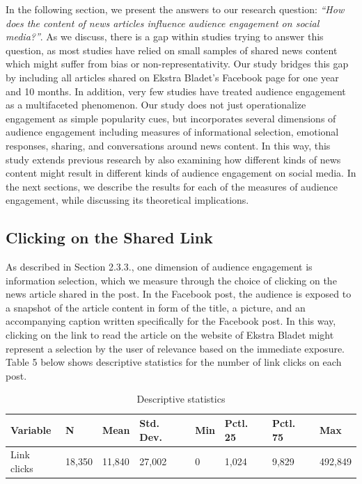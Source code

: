 \documentclass[
]{article}
\begin{document}
In the following section, we present the answers to our research
question: \emph{``How does the content of news articles influence
audience engagement on social media?''}. As we discuss, there is a gap
within studies trying to answer this question, as most studies have
relied on small samples of shared news content which might suffer from
bias or non-representativity. Our study bridges this gap by including
all articles shared on Ekstra Bladet's Facebook page for one year and 10
months. In addition, very few studies have treated audience engagement
as a multifaceted phenomenon. Our study does not just operationalize
engagement as simple popularity cues, but incorporates several
dimensions of audience engagement including measures of informational
selection, emotional responses, sharing, and conversations around news
content. In this way, this study extends previous research by also
examining how different kinds of news content might result in different
kinds of audience engagement on social media. In the next sections, we
describe the results for each of the measures of audience engagement,
while discussing its theoretical implications.

\hypertarget{clicking-on-the-shared-link}{%
\subsection{Clicking on the Shared
Link}\label{clicking-on-the-shared-link}}

As described in Section 2.3.3., one dimension of audience engagement is
information selection, which we measure through the choice of clicking
on the news article shared in the post. In the Facebook post, the
audience is exposed to a snapshot of the article content in form of the
title, a picture, and an accompanying caption written specifically for
the Facebook post. In this way, clicking on the link to read the article
on the website of Ekstra Bladet might represent a selection by the user
of relevance based on the immediate exposure. Table 5 below shows
descriptive statistics for the number of link clicks on each post.

\begin{table}[H]

\caption{\label{tab:click_describe}Descriptive statistics}
\centering
\begin{tabular}[t]{llllllll}
\toprule
Variable & N & Mean & Std. Dev. & Min & Pctl. 25 & Pctl. 75 & Max\\
\midrule
Link clicks & 18,350 & 11,840 & 27,002 & 0 & 1,024 & 9,829 & 492,849\\
\bottomrule
\end{tabular}
\end{table}
\end{document}
